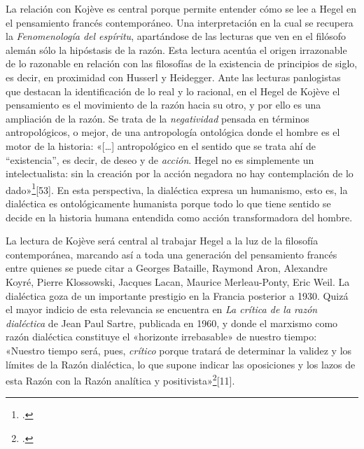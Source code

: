 La relación con Kojève es central porque permite entender cómo se lee a Hegel en el pensamiento francés contemporáneo. Una interpretación en la cual se recupera la \emph{Fenomenología del espíritu}, apartándose de las lecturas que ven en el filósofo alemán sólo la hipóstasis de la razón. Esta lectura acentúa el origen irrazonable de lo razonable en relación con las filosofías de la existencia de principios de siglo, es decir, en proximidad con Husserl y Heidegger. Ante las lecturas panlogistas que destacan la identificación de lo real y lo racional, en el Hegel de Kojève el pensamiento es el movimiento de la razón hacia su otro, y por ello es una ampliación de la razón. Se trata de la \emph{negatividad} pensada en términos antropológicos, o mejor, de una antropología ontológica donde el hombre es el motor de la historia: «{[}\ldots{]} antropológico en el sentido que se trata ahí de ``existencia'', es decir, de deseo y de \emph{acción}. Hegel no es simplemente un intelectualista: sin la creación por la acción negadora no hay contemplación de lo dado»\footcite{@6963-KOJEVE1996}[53]. En esta perspectiva, la dialéctica expresa un humanismo, esto es, la dialéctica es ontológicamente humanista porque todo lo que tiene sentido se decide en la historia humana entendida como acción transformadora del hombre.

La lectura de Kojève será central al trabajar Hegel a la luz de la filosofía contemporánea, marcando así a toda una generación del pensamiento francés entre quienes se puede citar a Georges Bataille, Raymond Aron, Alexandre Koyré, Pierre Klossowski, Jacques Lacan, Maurice Merleau-Ponty, Eric Weil. La dialéctica goza de un importante prestigio en la Francia posterior a 1930. Quizá el mayor indicio de esta relevancia se encuentra en \emph{La crítica de la razón dialéctica} de Jean Paul Sartre, publicada en 1960, y donde el marxismo como razón dialéctica constituye el «horizonte irrebasable» de nuestro tiempo: «Nuestro tiempo será, pues, \emph{crítico} porque tratará de determinar la validez y los límites de la Razón dialéctica, lo que supone indicar las oposiciones y los lazos de esta Razón con la Razón analítica y positivista»\footcite{@6964-SARTRE1995}[11].

